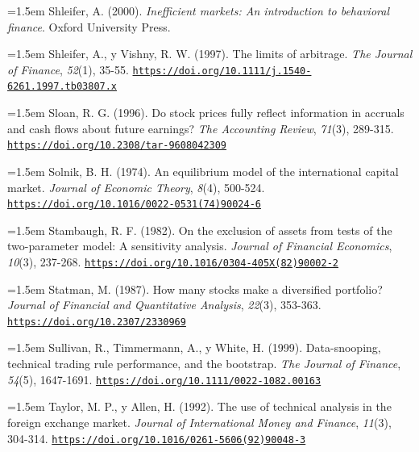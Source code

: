 \documentclass[10pt,a4paper]{article}
\begin{document}
\noindent\hangindent=1.5em Shleifer, A. (2000). \textit{Inefficient markets: An introduction to behavioral finance}. Oxford University Press.

\noindent\hangindent=1.5em Shleifer, A., y Vishny, R. W. (1997). The limits of arbitrage. \textit{The Journal of Finance}, \textit{52}(1), 35-55. \href{https://doi.org/10.1111/j.1540-6261.1997.tb03807.x}{\nolinkurl{https://doi.org/10.1111/j.1540-6261.1997.tb03807.x}}

\noindent\hangindent=1.5em Sloan, R. G. (1996). Do stock prices fully reflect information in accruals and cash flows about future earnings? \textit{The Accounting Review}, \textit{71}(3), 289-315. \href{https://doi.org/10.2308/tar-9608042309}{\nolinkurl{https://doi.org/10.2308/tar-9608042309}}

\noindent\hangindent=1.5em Solnik, B. H. (1974). An equilibrium model of the international capital market. \textit{Journal of Economic Theory}, \textit{8}(4), 500-524. \href{https://doi.org/10.1016/0022-0531(74)90024-6}{\nolinkurl{https://doi.org/10.1016/0022-0531(74)90024-6}}

\noindent\hangindent=1.5em Stambaugh, R. F. (1982). On the exclusion of assets from tests of the two-parameter model: A sensitivity analysis. \textit{Journal of Financial Economics}, \textit{10}(3), 237-268. \href{https://doi.org/10.1016/0304-405X(82)90002-2}{\nolinkurl{https://doi.org/10.1016/0304-405X(82)90002-2}}

\noindent\hangindent=1.5em Statman, M. (1987). How many stocks make a diversified portfolio? \textit{Journal of Financial and Quantitative Analysis}, \textit{22}(3), 353-363. \href{https://doi.org/10.2307/2330969}{\nolinkurl{https://doi.org/10.2307/2330969}}

\noindent\hangindent=1.5em Sullivan, R., Timmermann, A., y White, H. (1999). Data-snooping, technical trading rule performance, and the bootstrap. \textit{The Journal of Finance}, \textit{54}(5), 1647-1691. \href{https://doi.org/10.1111/0022-1082.00163}{\nolinkurl{https://doi.org/10.1111/0022-1082.00163}}

\noindent\hangindent=1.5em Taylor, M. P., y Allen, H. (1992). The use of technical analysis in the foreign exchange market. \textit{Journal of International Money and Finance}, \textit{11}(3), 304-314. \href{https://doi.org/10.1016/0261-5606(92)90048-3}{\nolinkurl{https://doi.org/10.1016/0261-5606(92)90048-3}}
\end{document}
